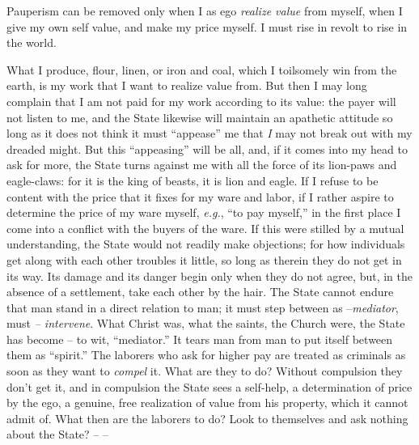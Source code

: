\documentclass[12pt,a4paper]{book}
\begin{document}
Pauperism can be removed only when I as ego \textit{realize value} from 
myself, when I give my own self value, and make my price myself. I must rise 
in revolt to rise in the world.

What I produce, flour, linen, or iron and coal, which I toilsomely win from 
the earth, is my work that I want to realize value from. But then I may long 
complain that I am not paid for my work according to its value: the payer will 
not listen to me, and the State likewise will maintain an apathetic attitude 
so long as it does not think it must ``appease'' me that \textit{I} may not 
break out with my dreaded might. But this ``appeasing'' will be all, and, if 
it comes into my head to ask for more, the State turns against me with all the 
force of its lion-paws and eagle-claws: for it is the king of beasts, it is 
lion and eagle. If I refuse to be content with the price that it fixes for my 
ware and labor, if I rather aspire to determine the price of my ware myself, 
\textit{e.g.}, ``to pay myself,'' in the first place I come into a conflict 
with the buyers of the ware. If this were stilled by a mutual understanding, 
the State would not readily make objections; for how individuals get along 
with each other troubles it little, so long as therein they do not get in its 
way. Its damage and its danger begin only when they do not agree, but, in the 
absence of a settlement, take each other by the hair. The State cannot endure 
that man stand in a direct relation to man; it must step between as 
--\textit{mediator}, must \textit{-- intervene}. What Christ was, what the 
saints, the Church were, the State has become -- to wit, ``mediator.'' It 
tears man from man to put itself between them as ``spirit.'' The laborers 
who ask for higher pay are treated as criminals as soon as they want to 
\textit{compel} it. What are they to do? Without compulsion they don't get it, 
and in compulsion the State sees a self-help, a determination of price by the 
ego, a genuine, free realization of value from his property, which it cannot 
admit of. What then are the laborers to do? Look to themselves and ask nothing 
about the State? -- --
\end{document}
